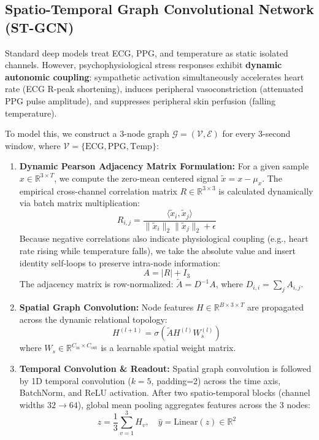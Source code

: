 \documentclass[conference]{IEEEtran}
\begin{document}
\subsection{Spatio-Temporal Graph Convolutional Network (ST-GCN)}
Standard deep models treat ECG, PPG, and temperature as static isolated channels. However, psychophysiological stress responses exhibit \textbf{dynamic autonomic coupling}: sympathetic activation simultaneously accelerates heart rate (ECG R-peak shortening), induces peripheral vasoconstriction (attenuated PPG pulse amplitude), and suppresses peripheral skin perfusion (falling temperature).

To model this, we construct a 3-node graph $\mathcal{G} = (\mathcal{V}, \mathcal{E})$ for every 3-second window, where $\mathcal{V} = \{\text{ECG}, \text{PPG}, \text{Temp}\}$:

\begin{enumerate}
    \item \textbf{Dynamic Pearson Adjacency Matrix Formulation:}
    For a given sample $x \in \mathbb{R}^{3 \times T}$, we compute the zero-mean centered signal $\tilde{x} = x - \mu_x$. The empirical cross-channel correlation matrix $R \in \mathbb{R}^{3 \times 3}$ is calculated dynamically via batch matrix multiplication:
    \begin{equation}
    R_{i,j} = \frac{\langle \tilde{x}_i, \tilde{x}_j \rangle}{\|\tilde{x}_i\|_2 \|\tilde{x}_j\|_2 + \epsilon}
    \end{equation}
    Because negative correlations also indicate physiological coupling (e.g., heart rate rising while temperature falls), we take the absolute value and insert identity self-loops to preserve intra-node information:
    \begin{equation}
    A = |R| + I_3
    \end{equation}
    The adjacency matrix is row-normalized: $\tilde{A} = D^{-1} A$, where $D_{i,i} = \sum_j A_{i,j}$.

    \item \textbf{Spatial Graph Convolution:}
    Node features $H \in \mathbb{R}^{B \times 3 \times T}$ are propagated across the dynamic relational topology:
    \begin{equation}
    H^{(l+1)} = \sigma\left(\tilde{A} H^{(l)} W_s^{(l)}\right)
    \end{equation}
    where $W_s \in \mathbb{R}^{C_{\text{in}} \times C_{\text{out}}}$ is a learnable spatial weight matrix.

    \item \textbf{Temporal Convolution \& Readout:}
    Spatial graph convolution is followed by 1D temporal convolution ($k=5$, padding=2) across the time axis, BatchNorm, and ReLU activation. After two spatio-temporal blocks (channel widths $32 \rightarrow 64$), global mean pooling aggregates features across the 3 nodes:
    \begin{equation}
    z = \frac{1}{3} \sum_{v=1}^3 H_v, \quad \hat{y} = \text{Linear}(z) \in \mathbb{R}^2
    \end{equation}
\end{enumerate}
\end{document}
